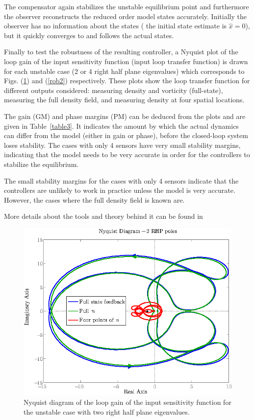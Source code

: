 \documentclass[12pt,lot, lof]{puthesis}
\begin{document}
The compensator again stabilizes the unstable equilibrium point and furthermore the observer reconstructs the reduced order model states accurately. Initially the observer has no information about the states ( the initial state estimate is $\hat x = 0$), but it quickly converges to and follows the actual states.

Finally to test the robustness of the resulting controller, a Nyquist \cite{Skogestad} plot of the loop gain of the input sensitivity function (input loop transfer function) is drawn for each unstable case (2 or 4 right half plane eigenvalues) which corresponds to Figs. (\ref{rob1}) and (\ref{rob2}) respectively. These plots show the loop transfer function for different outputs considered: measuring density and vorticity (full-state), measuring the full density field, and measuring density at four spatial locations.

 The gain (GM) and phase margins (PM) can be deduced from the plots and are given in Table~\ref{table3}. It indicates the amount by which the actual dynamics can differ from the model (either in gain or phase), before the closed-loop system loses stability.  The cases with only 4 sensors have very small stability margins, indicating that the model needs to be very accurate in order for the controllers to stabilize the equilibrium.
 
The small stability margins for the cases with only 4 sensors indicate that the controllers are unlikely to work in practice unless the model is very accurate.  However, the cases where the full density field is known are.

 More details about the tools and theory behind it can be found in \citet{Astrom}
 
\begin{figure}[htb]
\centering
\includegraphics[width=0.67 \linewidth]{robust1}
\caption{Nyquist diagram of the loop gain of the input sensitivity function for the unstable case with two right half plane eigenvalues.}
  \label{rob1}
\end{figure}
\end{document}
